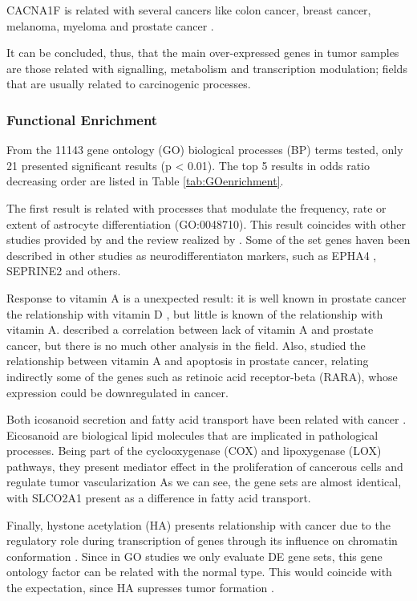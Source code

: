 \documentclass[9pt,twocolumn,twoside]{gsajnl}
\begin{document}
CACNA1F is related with several cancers like colon cancer, breast cancer, melanoma, myeloma and prostate cancer \citep{tcng}.


It can be concluded, thus, that the main over-expressed genes in tumor samples are those related with signalling, metabolism and transcription modulation; fields that are usually related to carcinogenic processes.


\subsubsection*{Functional Enrichment}

From the 11143 gene ontology (GO) biological processes (BP) terms tested, only 21 presented significant results (p < 0.01). The top 5 results in odds ratio decreasing order are listed in Table \ref{tab:GOenrichment}.

The first result is related with processes that modulate the frequency, rate or extent of astrocyte differentiation (GO:0048710). This result coincides with other studies provided by \cite{neuroendocrine3, neuroendocrine2} and the review realized by \cite{neuroendocrine1}. Some of the set genes haven been described in other studies as neurodifferentiaton markers, such as EPHA4 \cite{neuroendocrine_EPA}, SEPRINE2 \cite{mckee2013protease} and others.

Response to vitamin A is a unexpected result: it is well known in prostate cancer the relationship with vitamin D \citep{vitamin0,vitamind1,vitamind2,vitamind3}, but little is known of the relationship with vitamin A. \cite{vitamina1} described a correlation between lack of vitamin A and prostate cancer, but there is no much other analysis in the field. Also, \cite{vitamina2} studied the relationship between vitamin A and apoptosis in prostate cancer, relating indirectly some of the genes such as retinoic acid receptor-beta (RARA), whose expression could be downregulated in cancer.

Both icosanoid secretion and fatty acid transport have been related with cancer \citep{fat1,fat2}. Eicosanoid are biological lipid molecules that are implicated in pathological processes. Being part of the  cyclooxygenase (COX) and lipoxygenase (LOX) pathways, they present mediator effect in the proliferation of cancerous cells and regulate tumor vascularization \citep{fatvascu} As we can see, the gene sets are almost identical, with SLCO2A1 present as a difference in fatty acid transport.

Finally, hystone acetylation (HA) presents relationship with cancer due to the regulatory role during transcription of genes through its influence on chromatin conformation \citep{histoneacet, histoneacet2, histoneacet3, histoneacet4}. Since in GO studies we only evaluate DE gene sets, this gene ontology factor can be related with the normal type. This would coincide with the expectation, since HA supresses tumor formation \cite{histonea}.
\end{document}
